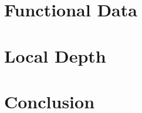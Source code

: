 \documentclass[12pt]{report}
\begin{document}
    \chapter{Functional Data}
    

    \chapter{Local Depth}
    \label{chap:localdepth}
    



    \chapter{Conclusion}
    


    \printbibliography

    \appendix
\end{document}
